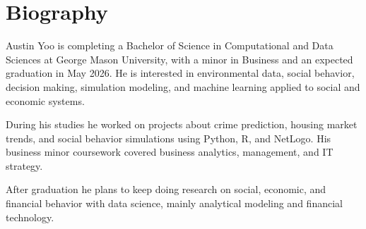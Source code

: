 \documentclass[12pt,letterpaper]{report}
\begin{document}
\chapter*{Biography}
Austin Yoo is completing a Bachelor of Science in Computational and Data Sciences at
George Mason University, with a minor in Business and an expected graduation in May 2026.
He is interested in environmental data, social behavior, decision making, simulation
modeling, and machine learning applied to social and economic systems.

During his studies he worked on projects about crime prediction, housing market trends, and
social behavior simulations using Python, R, and NetLogo. His business minor coursework
covered business analytics, management, and IT strategy.

After graduation he plans to keep doing research on social, economic, and financial behavior
with data science, mainly analytical modeling and financial technology.
\end{document}
